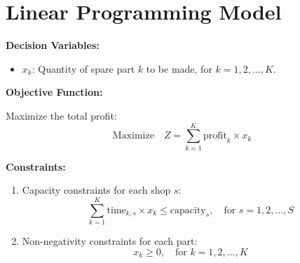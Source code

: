 \documentclass{article}
\begin{document}
\section*{Linear Programming Model}

\textbf{Decision Variables:}

\begin{itemize}
    \item \( x_k \): Quantity of spare part \( k \) to be made, for \( k = 1, 2, \ldots, K \).
\end{itemize}

\textbf{Objective Function:}

Maximize the total profit:
\[
\text{Maximize} \quad Z = \sum_{k=1}^{K} \text{profit}_{k} \times x_k
\]

\textbf{Constraints:}

\begin{enumerate}
    \item Capacity constraints for each shop \( s \):
    \[
    \sum_{k=1}^{K} \text{time}_{k, s} \times x_k \leq \text{capacity}_{s}, \quad \text{for } s = 1, 2, \ldots, S
    \]
    \item Non-negativity constraints for each part:
    \[
    x_k \geq 0, \quad \text{for } k = 1, 2, \ldots, K
    \]
\end{enumerate}
\end{document}

